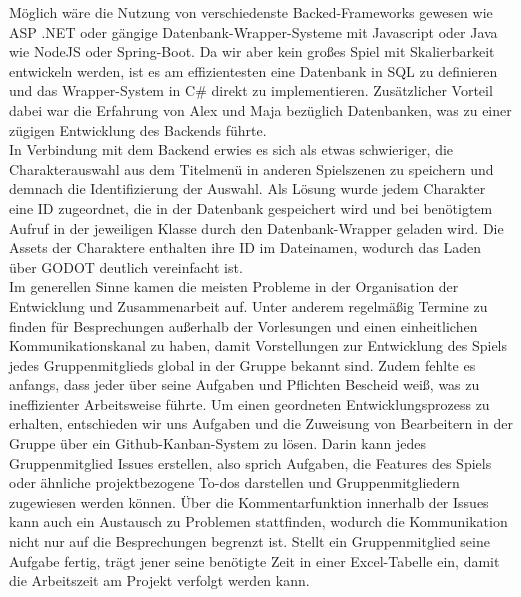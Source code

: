 Möglich wäre die Nutzung von verschiedenste Backed-Frameworks gewesen wie ASP .NET oder gängige 
Datenbank-Wrapper-Systeme mit Javascript oder Java wie NodeJS oder Spring-Boot.
Da wir aber kein großes Spiel mit Skalierbarkeit entwickeln werden, ist es am effizientesten eine Datenbank in SQL zu 
definieren und das Wrapper-System in C\# direkt zu implementieren. 
Zusätzlicher Vorteil dabei war die Erfahrung von Alex und Maja bezüglich Datenbanken, was zu einer zügigen Entwicklung
des Backends führte.\\
\newline
In Verbindung mit dem Backend erwies es sich als etwas schwieriger, die Charakterauswahl aus dem Titelmenü in anderen
Spielszenen zu speichern und demnach die Identifizierung der Auswahl.
Als Lösung wurde jedem Charakter eine ID zugeordnet, die in der Datenbank gespeichert wird und bei benötigtem Aufruf
in der jeweiligen Klasse durch den Datenbank-Wrapper geladen wird.
Die Assets der Charaktere enthalten ihre ID im Dateinamen, wodurch das Laden über GODOT deutlich vereinfacht ist. \\
\newline
Im generellen Sinne kamen die meisten Probleme in der Organisation der Entwicklung und Zusammenarbeit auf. 
Unter anderem regelmäßig Termine zu finden für Besprechungen außerhalb der Vorlesungen und einen einheitlichen
Kommunikationskanal zu haben, damit Vorstellungen zur Entwicklung des Spiels jedes Gruppenmitglieds global in der Gruppe
bekannt sind.
Zudem fehlte es anfangs, dass jeder über seine Aufgaben und Pflichten Bescheid weiß, was zu ineffizienter Arbeitsweise 
führte.
Um einen geordneten Entwicklungsprozess zu erhalten, entschieden wir uns Aufgaben und die Zuweisung von Bearbeitern 
in der Gruppe über ein Github-Kanban-System zu lösen.
Darin kann jedes Gruppenmitglied Issues erstellen, also sprich Aufgaben, die Features des Spiels oder ähnliche 
projektbezogene To-dos darstellen und Gruppenmitgliedern zugewiesen werden können.
Über die Kommentarfunktion innerhalb der Issues kann auch ein Austausch zu Problemen stattfinden,
wodurch die Kommunikation nicht nur auf die Besprechungen begrenzt ist.
Stellt ein Gruppenmitglied seine Aufgabe fertig, trägt jener seine benötigte Zeit in einer Excel-Tabelle ein, damit
die Arbeitszeit am Projekt verfolgt werden kann.